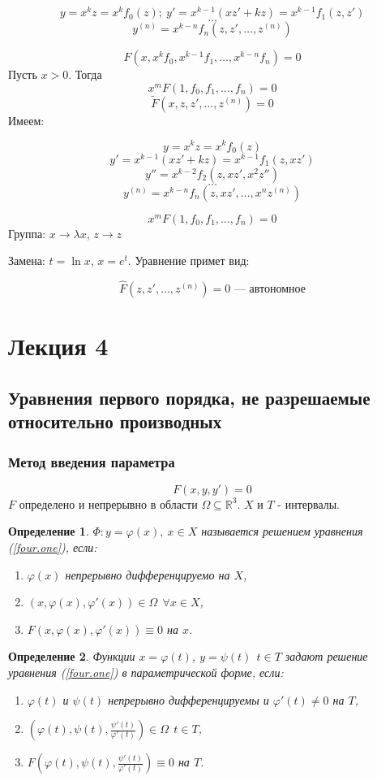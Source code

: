 \documentclass{article}
\newtheorem*{df}{Определение}
\newcommand{\re}[1]{(\ref{#1})}
\begin{document}
  \[ y  =x^kz = x^kf_0(z);~ y' = x^{k-1}(xz' + kz) = x^{k - 1}f_1(z, z') \]
  \[ \ldots \]
  \[ y^{(n)} = x^{k - n} f_n(z, z', \ldots, z^{(n)}) \]

  \[ F(x, x^kf_0, x^{k-1}f_1, \ldots, x^{k-n}f_n) = 0 \]
  Пусть $x > 0$. Тогда 
  \[ x^mF(1, f_0, f_1, \ldots, f_n) = 0 \]
  \[ \tilde{F}(x, z, z', \ldots, z^{(n)}) = 0 \]
  Имеем:

  \[ y = x^kz = x^kf_0(z) \]
  \[ y' = x^{k-1}(xz' + kz) = x^{k-1}f_1(z, xz') \]
  \[ y'' = x^{k-2}f_2(z, xz', x^2z'') \]
  \[ \ldots \]
  \[ y^{(n)} = x^{k-n}f_n(z, xz', \ldots, x^nz^{(n)}) \]

  \[ x^mF(1, f_0, f_1, \ldots, f_n) = 0\]
  Группа: $x \rightarrow \lambda x$, $z \rightarrow z$

  \noindent Замена: $t = \ln x$, $x = e^t$. Уравнение примет вид:

  \[ \hat{F}(z, z', \ldots, z^{(n)}) = 0 \text{ --- автономное}\]

  \section{Лекция 4}
  \subsection{Уравнения первого порядка, не разрешаемые относительно производных}
  \subsubsection{Метод введения параметра}
  \begin{equation}
  \label{four.one}
  F(x, y, y') = 0
  \end{equation}
  $F$ определено и непрерывно в области $ \Omega \subseteq \mathbb{R}^3$. $X$ и $T$ - интервалы.
  \begin{df}
  $\varPhi: y = \varphi(x),~ x \in X$ называется решением уравнения \re{four.one}, если:
  \begin{enumerate}
  \item $\varphi(x)$ непрерывно дифференцируемо на $X$,
  \item $(x, \varphi(x), \varphi'(x)) \in \Omega ~~ \forall x \in X$,
  \item $F(x, \varphi(x), \varphi'(x)) \equiv 0$ на $x$.
  \end{enumerate}
  \end{df}

  \begin{df}
  Функции $x = \varphi(t)$, $y = \psi(t)~~ t \in T$ задают решение уравнения \re{four.one} в параметрической форме, если:
  \begin{enumerate}
  \item $\varphi(t)$ и $\psi(t)$ непрерывно дифференцируемы и $\varphi'(t) \neq 0$ на $T$,
  \item $\left(\varphi(t), \psi(t), \frac{\psi'(t)}{\varphi'(t)}\right) \in \Omega ~~ t \in T$,
  \item $F\left(\varphi(t), \psi(t), \frac{\psi'(t)}{\varphi'(t)}\right) \equiv 0$ на $T$.
  \end{enumerate}
  \end{df}
\end{document}
